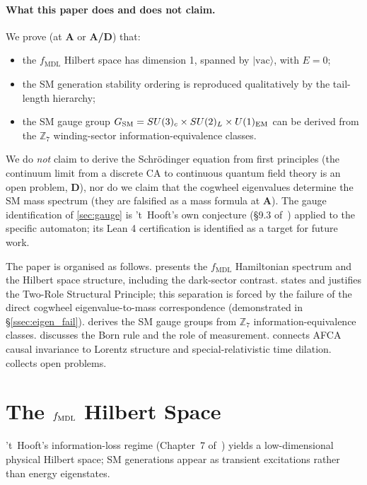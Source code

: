 \documentclass[11pt]{article}
\theoremstyle{remark}
\newcommand{\GTE}{\text{GTE}}
\newcommand{\MDL}{\text{MDL}}
\newcommand{\CatA}{\textbf{A}}
\newcommand{\CatAD}{\textbf{A/D}}
\newcommand{\CatD}{\textbf{D}}
\newcommand{\ket}[1]{|{#1}\rangle}
\begin{document}
\paragraph{What this paper does and does not claim.}
We prove (at \CatA{} or \CatAD{}) that:
\begin{itemize}[leftmargin=2em]
\item the $f_{\MDL}$ Hilbert space has dimension 1, spanned by
  $\ket{\text{vac}}$, with $E=0$;
\item the SM generation stability ordering is reproduced qualitatively
  by the tail-length hierarchy;
\item the SM gauge group $G_{\rm SM}=SU(3)_c\times SU(2)_L\times
  U(1)_{\rm EM}$ can be derived from the $\mathbb{Z}_7$ winding-sector
  information-equivalence classes.
\end{itemize}
We do \emph{not} claim to derive the Schr\"{o}dinger equation from first
principles (the continuum limit from a discrete CA to continuous quantum
field theory is an open problem, \CatD{}), nor do we claim that the
cogwheel eigenvalues determine the SM mass spectrum (they are falsified
as a mass formula at \CatA{}).
The gauge identification of \cref{sec:gauge} is 't~Hooft's own conjecture
(\S9.3 of~\cite{tHooft2016CA}) applied to the specific \GTE{} automaton;
its Lean 4 certification is identified as a target for future work.

The paper is organised as follows.
 presents the $f_{\MDL}$ Hamiltonian spectrum and the
Hilbert space structure, including the dark-sector contrast.
 states and justifies the Two-Role Structural Principle; this separation is forced by the failure of the direct cogwheel eigenvalue-to-mass correspondence (demonstrated in \S\ref{ssec:eigen_fail}).
 derives the SM gauge groups from $\mathbb{Z}_7$
information-equivalence classes.
 discusses the Born rule and the role of measurement.
 connects AFCA causal invariance to Lorentz
structure and special-relativistic time dilation.
 collects open problems.

\section{The \texorpdfstring{$f_{\protect\MDL}$}{fMDL} Hilbert Space}
\label{sec:hilbert}

't~Hooft's information-loss regime (Chapter~7 of~\cite{tHooft2016CA}) yields a low-dimensional physical Hilbert space; SM generations appear as transient excitations rather than energy eigenstates.
\end{document}
